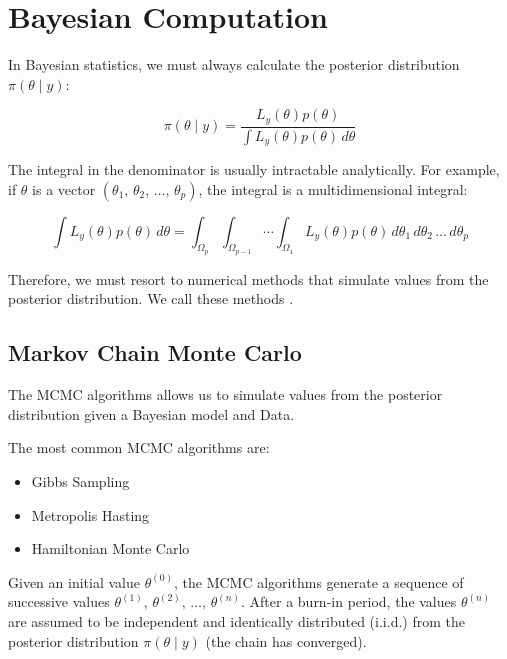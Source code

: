 
\section{Bayesian Computation}

In Bayesian statistics, we must always calculate the posterior
distribution $\pi(\theta \mid y)$:

\begin{equation*}
	\pi(\theta \mid y) = \frac{L_y(\theta)p(\theta)}{\int L_y(\theta)p(\theta)\,d\theta}
\end{equation*}

The integral in the denominator is usually intractable analytically. For example, if
$\theta$ is a vector $\left(\theta_1,\,\theta_2,\,\dots,\,\theta_p \right)$,
the integral is a multidimensional integral:

\begin{equation*}
	\int L_y(\theta)p(\theta)\,d\theta = \int_{\Omega_p} \int_{\Omega_{p-1}} \cdots \int_{\Omega_1} L_y(\theta)p(\theta)\,d\theta_1\,d\theta_2\,\dots\,d\theta_p
\end{equation*}

Therefore, we must resort to numerical methods that simulate values from the posterior
distribution.
We call these methods .

\subsection{Markov Chain Monte Carlo}

The MCMC algorithms allows us to simulate values from the posterior distribution given
a Bayesian model and Data.

The most common MCMC algorithms are:
\begin{itemize}
	\item Gibbs Sampling
	\item Metropolis Hasting
	\item Hamiltonian Monte Carlo
\end{itemize}

Given an initial value $\theta^{(0)}$, the MCMC algorithms generate a sequence of successive values
$\theta^{(1)},\,\theta^{(2)},\,\dots,\,\theta^{(n)}$. After a burn-in period, the values
$\theta^{(n)}$ are assumed to be independent and identically distributed (i.i.d.) from the
posterior distribution $\pi(\theta \mid y)$ (the chain has converged).

